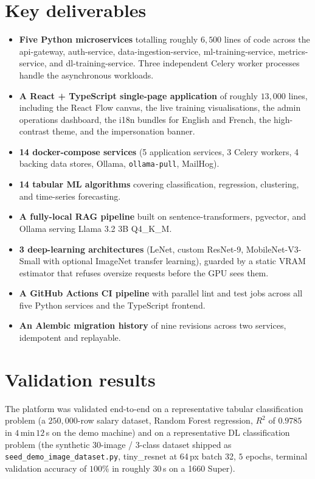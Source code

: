 \documentclass[12pt, a4paper]{report}
\begin{document}
\section*{Key deliverables}

\begin{itemize}
    \item \textbf{Five Python microservices} totalling roughly
        $6{,}500$ lines of code across the api-gateway, auth-service,
        data-ingestion-service, ml-training-service, metrics-service,
        and dl-training-service. Three independent Celery worker
        processes handle the asynchronous workloads.
    \item \textbf{A React + TypeScript single-page application} of
        roughly $13{,}000$ lines, including the React Flow canvas,
        the live training visualisations, the admin operations
        dashboard, the i18n bundles for English and French, the
        high-contrast theme, and the impersonation banner.
    \item \textbf{14 docker-compose services} (5 application
        services, 3 Celery workers, 4 backing data stores, Ollama,
        \texttt{ollama-pull}, MailHog).
    \item \textbf{14 tabular ML algorithms} covering classification,
        regression, clustering, and time-series forecasting.
    \item \textbf{A fully-local RAG pipeline} built on
        sentence-transformers, pgvector, and Ollama serving Llama
        3.2 3B Q4\_K\_M.
    \item \textbf{3 deep-learning architectures} (LeNet, custom
        ResNet-9, MobileNet-V3-Small with optional ImageNet transfer
        learning), guarded by a static VRAM estimator that refuses
        oversize requests before the GPU sees them.
    \item \textbf{A GitHub Actions CI pipeline} with parallel lint
        and test jobs across all five Python services and the
        TypeScript frontend.
    \item \textbf{An Alembic migration history} of nine revisions
        across two services, idempotent and replayable.
\end{itemize}

\section*{Validation results}

The platform was validated end-to-end on a representative tabular
classification problem (a $250{,}000$-row salary dataset, Random
Forest regression, $R^2$ of $0.9785$ in $4$\,min\,$12$\,s on the
demo machine) and on a representative DL classification problem (the
synthetic 30-image / 3-class dataset shipped as
\texttt{seed\_demo\_image\_dataset.py}, tiny\_resnet at 64\,px
batch 32, $5$ epochs, terminal validation accuracy of $100\%$ in
roughly $30$\,s on a 1660 Super).
\end{document}
